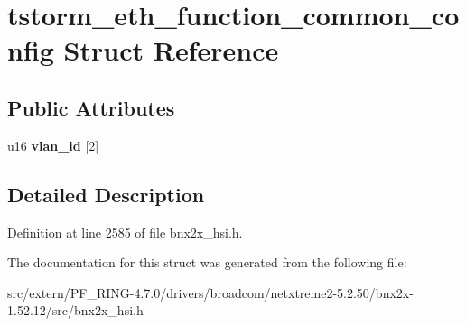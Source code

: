 \hypertarget{structtstorm__eth__function__common__config}{
\section{tstorm\_\-eth\_\-function\_\-common\_\-config Struct Reference}
\label{structtstorm__eth__function__common__config}
}
\subsection*{Public Attributes}
\begin{DoxyCompactItemize}
\item 
\hypertarget{structtstorm__eth__function__common__config_a92c9214819db99eaae55fb9464a47f1e}{
u16 {\bfseries vlan\_\-id} \mbox{[}2\mbox{]}}
\label{structtstorm__eth__function__common__config_a92c9214819db99eaae55fb9464a47f1e}

\end{DoxyCompactItemize}


\subsection{Detailed Description}


Definition at line 2585 of file bnx2x\_\-hsi.h.



The documentation for this struct was generated from the following file:\begin{DoxyCompactItemize}
\item 
src/extern/PF\_\-RING-\/4.7.0/drivers/broadcom/netxtreme2-\/5.2.50/bnx2x-\/1.52.12/src/bnx2x\_\-hsi.h\end{DoxyCompactItemize}
